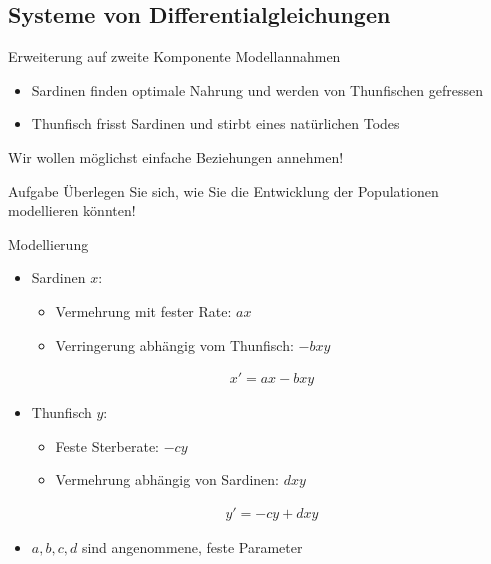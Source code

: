 \subsection{Systeme von Differentialgleichungen}

\begin{frame}{Erweiterung auf zweite Komponente}
  Modellannahmen
  \begin{itemize}
  \item Sardinen finden optimale Nahrung und werden von
    Thunfischen gefressen
  \item Thunfisch frisst Sardinen und stirbt eines natürlichen
    Todes
  \end{itemize}
  \pause
  Wir wollen möglichst einfache Beziehungen annehmen!
  \begin{exampleblock}{Aufgabe}
    Überlegen Sie sich, wie Sie die Entwicklung der Populationen
    modellieren könnten!
  \end{exampleblock}
\end{frame}

\begin{frame}{Modellierung}
  \begin{itemize}
  \item<+-> Sardinen $x$:
    \begin{itemize}
    \item Vermehrung mit fester Rate: $ax$
    \item Verringerung abhängig vom Thunfisch: $-bxy$
    \end{itemize}
    \begin{gather*}
      x' = ax-bxy
    \end{gather*}
  \item<+-> Thunfisch $y$:
    \begin{itemize}
    \item Feste Sterberate: $-cy$
    \item Vermehrung abhängig von Sardinen: $dxy$
    \end{itemize}
    \begin{gather*}
      y' = -cy + dxy
    \end{gather*}
  \item<+-> $a,b,c,d$ sind angenommene, feste Parameter
  \end{itemize}
\end{frame}

